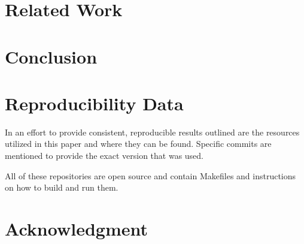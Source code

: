 \documentclass[conference]{IEEEtran}
\begin{document}
\section{Related Work}

\section{Conclusion}

\section{Reproducibility Data}

In an effort to provide consistent, reproducible results outlined are the
resources utilized in this paper and where they can be found.
Specific commits are mentioned to provide the exact version that was used.


All of these repositories are open source and contain Makefiles
and instructions on how to build and run them.

\section*{Acknowledgment}




\end{document}
